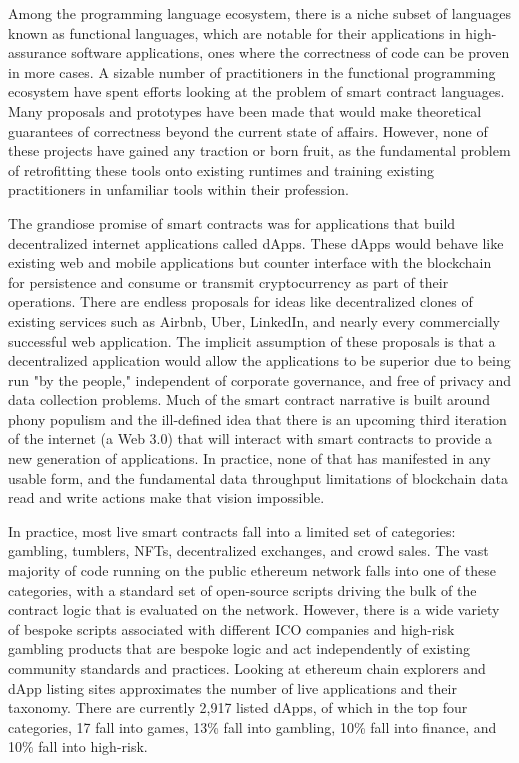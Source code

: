
Among the programming language ecosystem, there is a niche subset of languages
known as functional languages, which are notable for their applications in
high-assurance software applications, ones where the correctness of code can be
proven in more cases. A sizable number of practitioners in the functional
programming ecosystem have spent efforts looking at the problem of smart
contract languages. Many proposals and prototypes have been made that would make
theoretical guarantees of correctness beyond the current state of affairs.
However, none of these projects have gained any traction or born fruit, as the
fundamental problem of retrofitting these tools onto existing runtimes and
training existing practitioners in unfamiliar tools within their profession.

The grandiose promise of smart contracts was for applications that build
decentralized internet applications called dApps. These dApps would behave like
existing web and mobile applications but counter interface with the blockchain
for persistence and consume or transmit cryptocurrency as part of their
operations. There are endless proposals for ideas like decentralized clones of
existing services such as Airbnb, Uber, LinkedIn, and nearly every commercially
successful web application. The implicit assumption of these proposals is that a
decentralized application would allow the applications to be superior due to
being run "by the people," independent of corporate governance, and free of
privacy and data collection problems. Much of the smart contract narrative is
built around phony populism and the ill-defined idea that there is an upcoming
third iteration of the internet (a Web 3.0) that will interact with smart
contracts to provide a new generation of applications. In practice, none of that
has manifested in any usable form, and the fundamental data throughput
limitations of blockchain data read and write actions make that vision
impossible.

In practice, most live smart contracts fall into a limited set of categories:
gambling, tumblers, NFTs, decentralized exchanges, and crowd sales. The vast
majority of code running on the public ethereum network falls into one of these
categories, with a standard set of open-source scripts driving the bulk of the
contract logic that is evaluated on the network. However, there is a wide
variety of bespoke scripts associated with different ICO companies and high-risk
gambling products that are bespoke logic and act independently of existing
community standards and practices. Looking at ethereum chain explorers and dApp
listing sites approximates the number of live applications and their taxonomy.
There are currently 2,917 listed dApps, of which in the top four categories, 17%
fall into games, 13\% fall into gambling, 10\% fall into finance, and 10\% fall
into high-risk.

